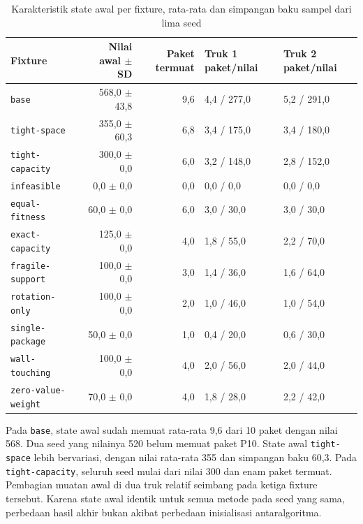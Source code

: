 \begin{table}[H]
    \centering
    \scriptsize
    \caption{Karakteristik state awal per fixture, rata-rata dan simpangan baku sampel dari lima seed}
    \label{tab:fleet-initial-states}
    \begin{tabular}{@{}lrrll@{}}
        \toprule
        Fixture                    & Nilai awal $\pm$ SD & Paket termuat & Truk 1 paket/nilai & Truk 2 paket/nilai \\
        \midrule
        \texttt{base}              & 568,0 $\pm$ 43,8    & 9,6           & 4,4 / 277,0        & 5,2 / 291,0        \\
        \texttt{tight-space}       & 355,0 $\pm$ 60,3    & 6,8           & 3,4 / 175,0        & 3,4 / 180,0        \\
        \texttt{tight-capacity}    & 300,0 $\pm$ 0,0     & 6,0           & 3,2 / 148,0        & 2,8 / 152,0        \\
        \texttt{infeasible}        & 0,0 $\pm$ 0,0       & 0,0           & 0,0 / 0,0          & 0,0 / 0,0          \\
        \texttt{equal-fitness}     & 60,0 $\pm$ 0,0      & 6,0           & 3,0 / 30,0         & 3,0 / 30,0         \\
        \texttt{exact-capacity}    & 125,0 $\pm$ 0,0     & 4,0           & 1,8 / 55,0         & 2,2 / 70,0         \\
        \texttt{fragile-support}   & 100,0 $\pm$ 0,0     & 3,0           & 1,4 / 36,0         & 1,6 / 64,0         \\
        \texttt{rotation-only}     & 100,0 $\pm$ 0,0     & 2,0           & 1,0 / 46,0         & 1,0 / 54,0         \\
        \texttt{single-package}    & 50,0 $\pm$ 0,0      & 1,0           & 0,4 / 20,0         & 0,6 / 30,0         \\
        \texttt{wall-touching}     & 100,0 $\pm$ 0,0     & 4,0           & 2,0 / 56,0         & 2,0 / 44,0         \\
        \texttt{zero-value-weight} & 70,0 $\pm$ 0,0      & 4,0           & 1,8 / 28,0         & 2,2 / 42,0         \\
        \bottomrule
    \end{tabular}
\end{table}

Pada \texttt{base}, state awal sudah memuat rata-rata 9,6 dari 10 paket dengan nilai 568. Dua seed yang nilainya 520 belum memuat paket P10. State awal \texttt{tight-space} lebih bervariasi, dengan nilai rata-rata 355 dan simpangan baku 60,3. Pada \texttt{tight-capacity}, seluruh seed mulai dari nilai 300 dan enam paket termuat. Pembagian muatan awal di dua truk relatif seimbang pada ketiga fixture tersebut. Karena state awal identik untuk semua metode pada seed yang sama, perbedaan hasil akhir bukan akibat perbedaan inisialisasi antaralgoritma.

